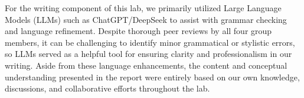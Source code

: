 \documentclass[11pt,letterpaper]{article}
\begin{document}
For the writing component of this lab, we primarily utilized Large Language Models (LLMs) such as ChatGPT/DeepSeek to assist with grammar checking and language refinement. Despite thorough peer reviews by all four group members, it can be challenging to identify minor grammatical or stylistic errors, so LLMs served as a helpful tool for ensuring clarity and professionalism in our writing. Aside from these language enhancements, the content and conceptual understanding presented in the report were entirely based on our own knowledge, discussions, and collaborative efforts throughout the lab.
\end{document}
